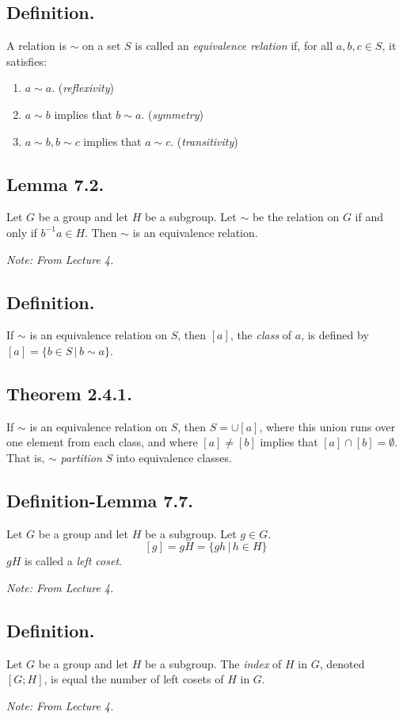 \documentclass{article}
\newenvironment{thm}[1]{\subsection*{Theorem #1.}}{}
\newenvironment{lemma}[1]{\subsection*{Lemma #1.}}{}
\newenvironment{defn}{\subsection*{Definition.}}{}
\newenvironment{defnlemma}[1]{\subsection*{Definition-Lemma #1.}}{}
\begin{document}
\begin{defn}
    A relation is $\sim$ on a set $S$ is called an \textit{equivalence relation} if,
    for all $a, b, c \in S$, it satisfies:
    \begin{enumerate}[label=(\alph*)]
        \item $a \sim a$. (\textit{reflexivity})
        \item $a \sim b$ implies that $b \sim a$. (\textit{symmetry})
        \item $a \sim b, b \sim c$ implies that $a \sim c$. (\textit{transitivity})
    \end{enumerate}
\end{defn}

\begin{lemma}{7.2}
    Let $G$ be a group and let $H$ be a subgroup. Let $\sim$ be the relation on $G$ if and only if $b^{-1}a \in H$.
    Then $\sim$ is an equivalence relation.

    \textit{Note: From Lecture 4.}
\end{lemma}

\begin{defn}
    If $\sim$ is an equivalence relation on $S$, then $[a]$, 
    the \textit{class} of $a$, is defined by $[a] = \{b \in S \, | \, b \sim a\}$.
\end{defn}

\begin{thm}{2.4.1}
    If $\sim$ is an equivalence relation on $S$, then $S = \cup[a]$,
    where this union runs over one element from each class, and where $[a] \neq [b]$
    implies that $[a] \cap [b] = \emptyset$. That is, $\sim$ \textit{partition} $S$ into equivalence classes.
\end{thm}

\begin{defnlemma}{7.7}
    Let $G$ be a group and let $H$ be a subgroup. Let $g \in G$.
    \[
        [g] = gH = \{gh \, | \, h \in H\}  
    \]
    $gH$ is called a \textit{left coset}.

    \textit{Note: From Lecture 4.}
\end{defnlemma}

\begin{defn}
    Let $G$ be a group and let $H$ be a subgroup.
    The \textit{index} of $H$ in $G$, denoted $[G; H]$,
    is equal the number of left cosets of $H$ in $G$.

    \textit{Note: From Lecture 4.}
\end{defn}
\end{document}
